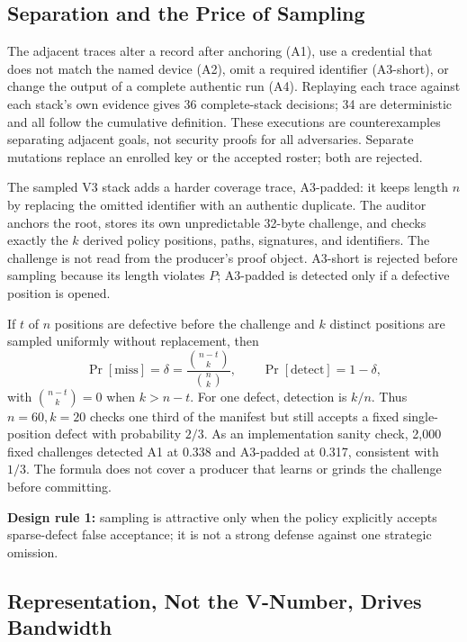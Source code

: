 \subsection{Separation and the Price of Sampling}
\label{sec:separation}

The adjacent traces alter a record after anchoring (A1), use a credential that
does not match the named device (A2), omit a required identifier (A3-short), or
change the output of a complete authentic run (A4). Replaying each trace against
each stack's own evidence gives 36 complete-stack decisions; 34 are
deterministic and all follow the cumulative definition. These executions are
counterexamples separating adjacent goals, not security proofs for all
adversaries. Separate mutations replace an enrolled key or the accepted roster;
both are rejected.

The sampled V3 stack adds a harder coverage trace, A3-padded: it keeps length
$n$ by replacing the omitted identifier with an authentic duplicate. The
auditor anchors the root, stores its own unpredictable 32-byte challenge, and
checks exactly the $k$ derived policy positions, paths, signatures, and
identifiers. The challenge is not read from the producer's proof object.
A3-short is rejected before sampling because its length violates $P$;
A3-padded is detected only if a defective position is opened.

If $t$ of $n$ positions are defective before the challenge and $k$ distinct
positions are sampled uniformly without replacement, then
\[
 \Pr[\mathrm{miss}]=\delta=\frac{\binom{n-t}{k}}{\binom{n}{k}},\qquad
 \Pr[\mathrm{detect}]=1-\delta,
\]
with $\binom{n-t}{k}=0$ when $k>n-t$. For one defect, detection is $k/n$.
Thus $n=60,k=20$ checks one third of the manifest but still accepts a fixed
single-position defect with probability $2/3$. As an implementation sanity
check, 2,000 fixed challenges detected A1 at 0.338 and A3-padded at 0.317,
consistent with $1/3$. The formula does not cover a producer that learns or
grinds the challenge before committing.

\textbf{Design rule 1:} sampling is attractive only when the policy explicitly
accepts sparse-defect false acceptance; it is not a strong defense against one
strategic omission.

\subsection{Representation, Not the V-Number, Drives Bandwidth}

